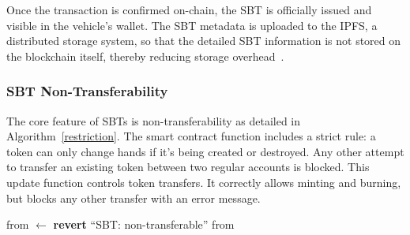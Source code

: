 \cite{cho2010survey}\documentclass[journal,comsoc,twoside]{IEEEtran}
\begin{document}
Once the transaction is confirmed on-chain, the SBT is officially issued and visible in the vehicle's wallet. The SBT metadata is uploaded to the IPFS, a distributed storage system, so that the detailed SBT information is not stored on the blockchain itself, thereby reducing storage overhead~\cite{sejin}.

\subsubsection{SBT Non-Transferability}
The core feature of SBTs is non-transferability as detailed in Algorithm~\ref{restriction}. The smart contract function includes a strict rule: a token can only change hands if it's being created or destroyed.  Any other attempt to transfer an existing token between two regular accounts is blocked. This update function controls token transfers. It correctly allows minting and burning, but blocks any other transfer with an error message.

\begin{algorithm}
\caption{SBT Transfer Restriction}
\label{restriction}
\begin{algorithmic}[1]
    \State from $\gets$ 
        \State \textbf{revert} ``SBT: non-transferable''
    \EndIf
    \State \Return from
\EndFunction
\end{algorithmic}
\end{algorithm}
\end{document}
